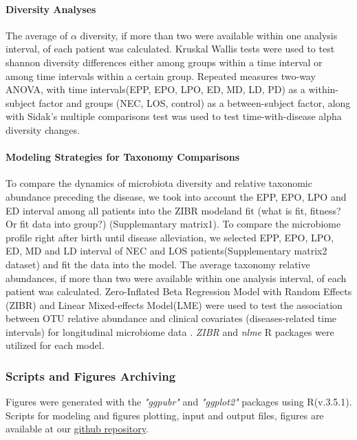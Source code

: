 \documentclass[fleqn,10pt]{wlpeerj} %
\begin{document}
      \paragraph{Diversity Analyses}
      The average of $\alpha$ diversity, if more than two were available within one analysis interval, of each patient was calculated. Kruskal Wallis tests were used to test shannon diversity differences either among groups within a time interval or among time intervals within a certain group. Repeated measures two-way ANOVA, with time intervals(EPP, EPO, LPO, ED, MD, LD, PD) as a within-subject factor and groups (NEC, LOS, control) as a between-subject factor, along with Sidak’s multiple comparisons test was used to test time-with-disease alpha diversity changes.
      \paragraph*{Modeling Strategies for Taxonomy Comparisons}
      To compare the dynamics of microbiota diversity and relative taxonomic abundance preceding the disease, we took into account the EPP, EPO, LPO and ED interval among all patients into the ZIBR modeland fit (what is fit, fitness? Or fit data into group?) (Supplemantary matrix1).
      To compare the microbiome profile right after birth until disease alleviation, we selected EPP, EPO, LPO, ED, MD and LD interval of NEC and LOS patients(Supplementary matrix2 dataset) and fit the data into the model.
      The average taxonomy relative abundances, if more than two were available within one analysis interval, of each patient was calculated.
      Zero-Inflated Beta Regression Model with Random Effects (ZIBR) and Linear Mixed-effects Model(LME) were used to test the association between OTU relative abundance and clinical covariates (diseases-related time intervals) for longitudinal microbiome data \citep{chen2016two}. \textit{ZIBR} and \textit{nlme}\citep{nlme} R packages were utilized for each model.

    \subsubsection*{Scripts and Figures Archiving}
    Figures were generated with the \textit{"ggpubr"}\citep{kassambara2017ggpubr} and \textit{"ggplot2"}\citep{ggplot2} packages using R(v.3.5.1).
    Scripts for modeling and figures plotting, input and output files, figures are available at our \href{https://github.com/jiayiliujiayi/NEC-LOS-microbiota_pattern_comparison}{github repository}.
\end{document}
